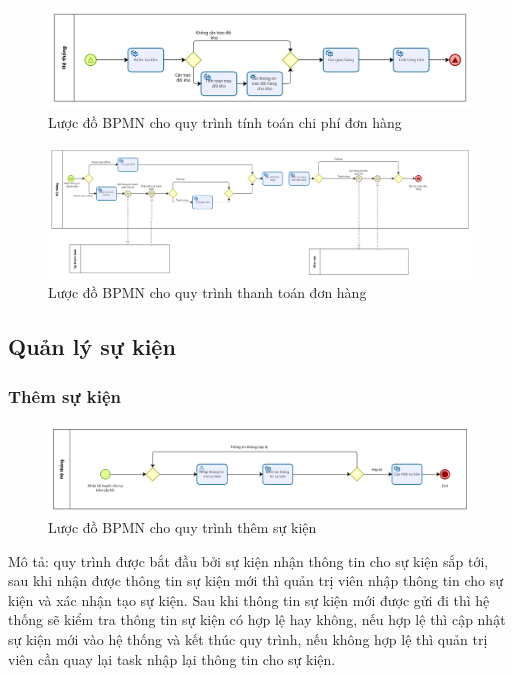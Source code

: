     \begin{figure}[!htp]
        \centering
        \includegraphics[width=5in]{img/BPMN/customer_buy/customer_calc_fee.png}
        \newline
        \caption{Lược đồ BPMN cho quy trình tính toán chi phí đơn hàng}
    \end{figure}
    \begin{figure}[!htp]
        \centering
        \includegraphics[width=15cm]{img/BPMN/customer_buy/customer_payment.png}
        \newline
        \caption{Lược đồ BPMN cho quy trình thanh toán đơn hàng}
    \end{figure}

\newpage
\subsection{Quản lý sự kiện}

\subsubsection{Thêm sự kiện}

\begin{figure}[!htp]
    \centering
    \includegraphics[width=14cm]{img/BPMN/event/add_event.png}
    \newline
    \caption{Lược đồ BPMN cho quy trình thêm sự kiện}
\end{figure}
Mô tả: quy trình được bắt đầu bởi sự kiện nhận thông tin cho sự kiện sắp tới, sau khi nhận được thông tin sự kiện mới thì quản trị viên nhập thông tin cho sự kiện và xác nhận tạo sự kiện. Sau khi thông tin sự kiện mới được gửi đi thì hệ thống sẽ kiểm tra thông tin sự kiện có hợp lệ hay không, nếu hợp lệ thì cập nhật sự kiện mới vào hệ thống và kết thúc quy trình, nếu không hợp lệ thì quản trị viên cần quay lại task nhập lại thông tin cho sự kiện.

